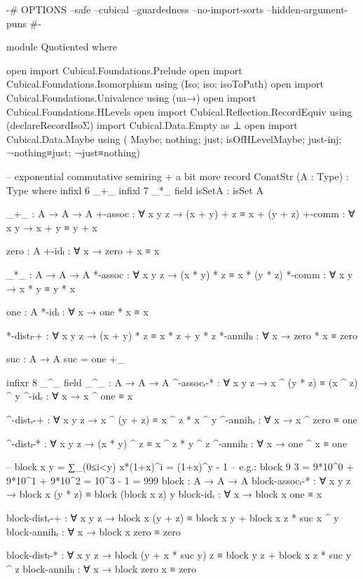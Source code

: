 \begin{code}[hide]
{-# OPTIONS
  --safe
  --cubical
  --guardedness
  --no-import-sorts
  --hidden-argument-puns #-}

module Quotiented where

open import Cubical.Foundations.Prelude
open import Cubical.Foundations.Isomorphism using (Iso; iso; isoToPath)
open import Cubical.Foundations.Univalence using (ua→)
open import Cubical.Foundations.HLevels
open import Cubical.Reflection.RecordEquiv using (declareRecordIsoΣ)
import Cubical.Data.Empty as ⊥
open import Cubical.Data.Maybe
  using
    ( Maybe; nothing; just;
      isOfHLevelMaybe; just-inj; ¬nothing≡just; ¬just≡nothing)

-- exponential commutative semiring + a bit more
record ConatStr (A : Type) : Type where
  infixl 6 _+_
  infixl 7 _*_
  field
    isSetA : isSet A

    _+_ : A → A → A
    +-assoc : ∀ x y z → (x + y) + z ≡ x + (y + z)
    +-comm : ∀ x y → x + y ≡ y + x

    zero : A
    +-idₗ : ∀ x → zero + x ≡ x

    _*_ : A → A → A
    *-assoc : ∀ x y z → (x * y) * z ≡ x * (y * z)
    *-comm : ∀ x y → x * y ≡ y * x

    one : A
    *-idₗ : ∀ x → one * x ≡ x

    *-distₗ-+ : ∀ x y z → (x + y) * z ≡ x * z + y * z
    *-annihₗ : ∀ x → zero * x ≡ zero

  suc : A → A
  suc = one +_

  infixr 8 _^_
  field
    _^_ : A → A → A
    ^-assocᵣ-* : ∀ x y z → x ^ (y * z) ≡ (x ^ z) ^ y
    ^-idᵣ : ∀ x → x ^ one ≡ x

    ^-distᵣ-+ : ∀ x y z → x ^ (y + z) ≡ x ^ z * x ^ y
    ^-annihᵣ : ∀ x → x ^ zero ≡ one

    ^-distₗ-* : ∀ x y z → (x * y) ^ z ≡ x ^ z * y ^ z
    ^-annihₗ : ∀ x → one ^ x ≡ one

    -- block x y = ∑_(0≤i<y) x*(1+x)^i = (1+x)^y - 1
    -- e.g.: block 9 3 = 9*10^0 + 9*10^1 + 9*10^2 = 10^3 - 1 = 999
    block : A → A → A
    block-assocᵣ-* : ∀ x y z → block x (y * z) ≡ block (block x z) y
    block-idᵣ : ∀ x → block x one ≡ x

    block-distᵣ-+ :
      ∀ x y z → block x (y + z) ≡ block x y + block x z * suc x ^ y
    block-annihᵣ : ∀ x → block x zero ≡ zero

    block-distₗ-* :
      ∀ x y z → block (y + x * suc y) z ≡ block y z + block x z * suc y ^ z
    block-annihₗ : ∀ x → block zero x ≡ zero


\end{code}
